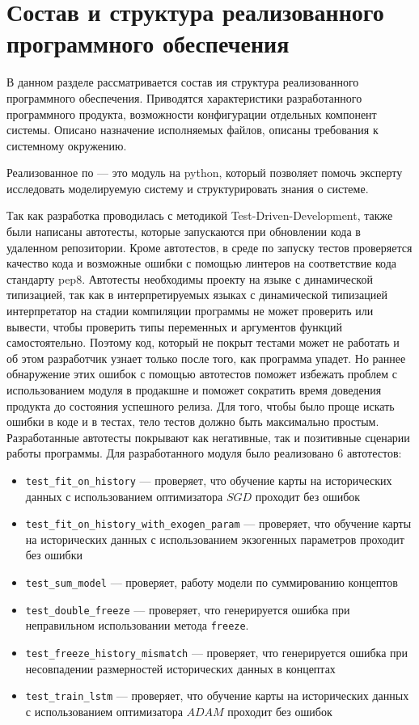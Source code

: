 \section{Состав и структура реализованного программного обеспечения}
\begin{annotation}
	В данном разделе рассматривается состав ия структура реализованного программного обеспечения.
	Приводятся характеристики разработанного программного продукта, возможности конфигурации отдельных
	компонент системы. Описано назначение исполняемых файлов, описаны требования к системному окружению.
\end{annotation}

Реализованное по --- это модуль на python, который позволяет помочь эксперту
исследовать моделируемую систему и структурировать знания о системе.

Так как разработка проводилась с методикой Test-Driven-Development,
также были написаны автотесты, которые запускаются
при обновлении кода в удаленном репозитории. Кроме автотестов,
в среде по запуску тестов проверяется качество кода и возможные ошибки
с помощью линтеров на соответствие кода стандарту pep8.
Автотесты необходимы проекту на языке с динамической типизацией,
так как в интерпретируемых языках с динамической типизацией
интерпретатор на стадии компиляции программы не может проверить или вывести, чтобы проверить
типы переменных и аргументов функций самостоятельно. Поэтому код, который
не покрыт тестами может не работать и об этом разработчик узнает
только после того, как программа упадет. Но раннее обнаружение этих
ошибок с помощью автотестов поможет избежать проблем с использованием модуля в
продакшне и поможет сократить время доведения продукта до состояния успешного релиза.
Для того, чтобы было проще искать ошибки в коде и в тестах,
тело тестов должно быть максимально простым.
Разработанные автотесты покрывают как негативные, так и позитивные
сценарии работы программы.
Для разработанного модуля было реализовано 6 автотестов:

\begin{itemize}
	\item \verb|test_fit_on_history| --- проверяет, что обучение карты на исторических данных с использованием оптимизатора $ SGD $ проходит без ошибок
	\item \verb|test_fit_on_history_with_exogen_param| --- проверяет, что обучение карты на исторических данных с использованием экзогенных параметров проходит без ошибки
	\item \verb|test_sum_model| --- проверяет, работу модели по суммированию концептов
	\item \verb|test_double_freeze| --- проверяет, что генерируется ошибка при неправильном использовании метода \verb|freeze|.
	\item \verb|test_freeze_history_mismatch| --- проверяет, что генерируется ошибка при несовпадении размерностей исторических данных в концептах
	\item \verb|test_train_lstm| --- проверяет, что обучение карты на исторических данных с использованием оптимизатора $ ADAM $ проходит без ошибок
\end{itemize}

